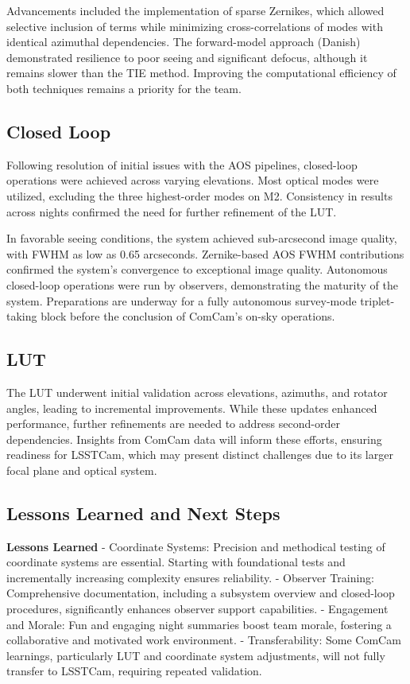 Advancements included the implementation of sparse Zernikes, which allowed selective 
inclusion of terms while minimizing cross-correlations of modes with identical azimuthal 
dependencies. The forward-model approach (Danish) demonstrated resilience to poor seeing 
and significant defocus, although it remains slower than the TIE method. Improving the 
computational efficiency of both techniques remains a priority for the team.

\subsection{Closed Loop}
Following resolution of initial issues with the AOS pipelines, 
closed-loop operations were achieved across varying elevations. 
Most optical modes were utilized, excluding the three highest-order modes on M2. 
Consistency in results across nights confirmed the need for further refinement of the LUT.

In favorable seeing conditions, the system achieved sub-arcsecond image 
quality, with FWHM as low as 0.65 arcseconds. Zernike-based AOS FWHM 
contributions confirmed the system's convergence to exceptional image 
quality. Autonomous closed-loop operations were run by observers, 
demonstrating the maturity of the system. Preparations are underway 
for a fully autonomous survey-mode triplet-taking block before the 
conclusion of ComCam's on-sky operations.

\subsection{LUT}
The LUT underwent initial validation across elevations, azimuths, and rotator angles, 
leading to incremental improvements. While these updates enhanced performance, 
further refinements are needed to address second-order dependencies. Insights 
from ComCam data will inform these efforts, ensuring readiness for LSSTCam, which 
may present distinct challenges due to its larger focal plane and optical system.

\subsection{Lessons Learned and Next Steps}
\textbf{Lessons Learned}
- Coordinate Systems: Precision and methodical testing of coordinate systems are essential. 
Starting with foundational tests and incrementally increasing complexity ensures reliability.
- Observer Training: Comprehensive documentation, including a subsystem overview and closed-loop procedures, 
significantly enhances observer support capabilities.
- Engagement and Morale: Fun and engaging night summaries boost team morale, fostering a collaborative 
and motivated work environment.
- Transferability: Some ComCam learnings, particularly LUT and coordinate system adjustments, 
will not fully transfer to LSSTCam, requiring repeated validation.

